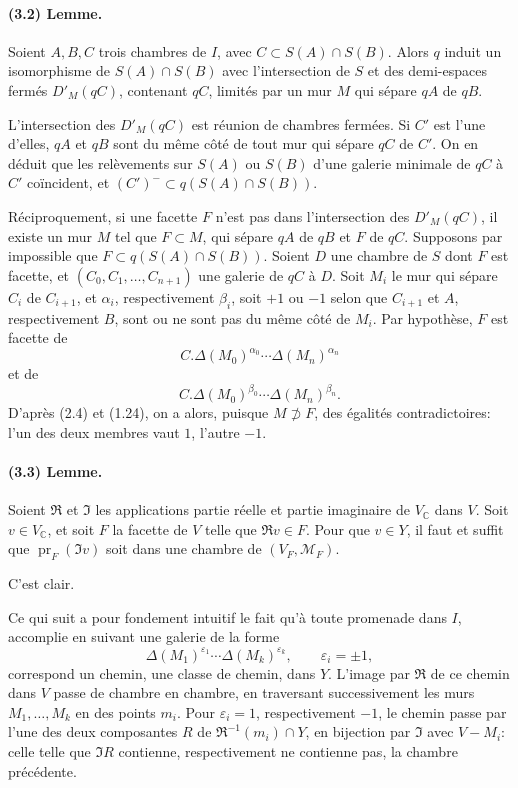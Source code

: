 \documentclass[10pt]{article}
\newcommand{\C}{\mathbb C}
\begin{document}
\paragraph{(3.2) Lemme.} Soient \(A,B,C\) trois chambres de \(I\), avec \(C\subset S(A)\cap S(B)\). Alors \(q\) induit un isomorphisme de \(S(A)\cap S(B)\) avec l'intersection de \(S\) et des demi-espaces fermés \(D'_M(qC)\), contenant \(qC\), limités par un mur \(M\) qui sépare \(qA\) de \(qB\).

L'intersection des \(D'_M(qC)\) est réunion de chambres fermées. Si \(C'\) est l'une d'elles, \(qA\) et \(qB\) sont du même côté de tout mur qui sépare \(qC\) de \(C'\). On en déduit que les relèvements sur \(S(A)\) ou \(S(B)\) d'une galerie minimale de \(qC\) à \(C'\) coïncident, et \((C')^{-}\subset q(S(A)\cap S(B))\).

Réciproquement, si une facette \(F\) n'est pas dans l'intersection des \(D'_M(qC)\), il existe un mur \(M\) tel que \(F\subset M\), qui sépare \(qA\) de \(qB\) et \(F\) de \(qC\). Supposons par impossible que \(F\subset q(S(A)\cap S(B))\). Soient \(D\) une chambre de \(S\) dont \(F\) est facette, et \((C_0,C_1,\ldots,C_{n+1})\) une galerie de \(qC\) à \(D\). Soit \(M_i\) le mur qui sépare \(C_i\) de \(C_{i+1}\), et \(\alpha_i\), respectivement \(\beta_i\), soit \(+1\) ou \(-1\) selon que \(C_{i+1}\) et \(A\), respectivement \(B\), sont ou ne sont pas du même côté de \(M_i\). Par hypothèse, \(F\) est facette de
\[
C.\Delta(M_0)^{\alpha_0}\cdots \Delta(M_n)^{\alpha_n}
\]
et de
\[
C.\Delta(M_0)^{\beta_0}\cdots \Delta(M_n)^{\beta_n}.
\]
D'après (2.4) et (1.24), on a alors, puisque \(M\not\supset F\), des égalités contradictoires: l'un des deux membres vaut \(1\), l'autre \(-1\).

\paragraph{(3.3) Lemme.} Soient \(\Re\) et \(\Im\) les applications partie réelle et partie imaginaire de \(V_\C\) dans \(V\). Soit \(v\in V_\C\), et soit \(F\) la facette de \(V\) telle que \(\Re v\in F\). Pour que \(v\in Y\), il faut et suffit que \(\operatorname{pr}_F(\Im v)\) soit dans une chambre de \((V_F,\mathcal M_F)\).

C'est clair.

Ce qui suit a pour fondement intuitif le fait qu'à toute promenade dans \(I\), accomplie en suivant une galerie de la forme
\[
\Delta(M_1)^{\varepsilon_1}\cdots \Delta(M_k)^{\varepsilon_k},\qquad \varepsilon_i=\pm1,
\]
correspond un chemin, une classe de chemin, dans \(Y\). L'image par \(\Re\) de ce chemin dans \(V\) passe de chambre en chambre, en traversant successivement les murs \(M_1,\ldots,M_k\) en des points \(m_i\). Pour \(\varepsilon_i=1\), respectivement \(-1\), le chemin passe par l'une des deux composantes \(R\) de \(\Re^{-1}(m_i)\cap Y\), en bijection par \(\Im\) avec \(V-M_i\): celle telle que \(\Im R\) contienne, respectivement ne contienne pas, la chambre précédente.
\end{document}
